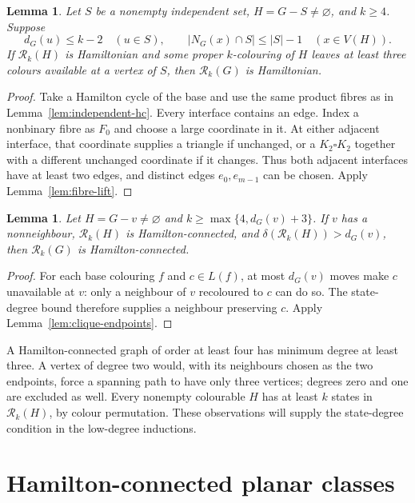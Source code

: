 \documentclass[11pt]{article}
\newtheorem{lemma}[theorem]{Lemma}
\theoremstyle{remark}
\newcommand{\Rk}{\mathcal R_k}
\numberwithin{equation}{section}
\numberwithin{table}{section}
\begin{document}
\begin{lemma}
\label{lem:independent-restoration}
Let $S$ be a nonempty independent set, $H=G-S\ne\varnothing$, and
$k\ge4$.  Suppose
\[
 d_G(u)\le k-2\quad(u\in S),\qquad
 |N_G(x)\cap S|\le |S|-1\quad(x\in V(H)).
\]
If $\Rk(H)$ is Hamiltonian and some proper $k$-colouring of $H$ leaves
at least three colours available at a vertex of $S$, then $\Rk(G)$ is
Hamiltonian.
\end{lemma}

\begin{proof}
Take a Hamilton cycle of the base and use the same product fibres as in
Lemma~\ref{lem:independent-hc}.  Every interface contains an edge.
Index a nonbinary fibre as $F_0$ and choose a large coordinate in it.
At either adjacent interface, that coordinate supplies a triangle if
unchanged, or a $K_2\square K_2$ together with a different unchanged
coordinate if it changes.  Thus both adjacent interfaces have at least
two edges, and distinct edges $e_0,e_{m-1}$ can be chosen.  Apply
Lemma~\ref{lem:fibre-lift}.
\end{proof}

\begin{lemma}\label{lem:single-hc}
Let $H=G-v\ne\varnothing$ and $k\ge\max\{4,d_G(v)+3\}$.
If $v$ has a nonneighbour, $\Rk(H)$ is Hamilton-connected, and
$\delta(\Rk(H))>d_G(v)$, then $\Rk(G)$ is Hamilton-connected.
\end{lemma}
\begin{proof}
For each base colouring $f$ and $c\in L(f)$, at most $d_G(v)$
moves make $c$ unavailable at $v$: only a neighbour of $v$
recoloured to $c$ can do so. The state-degree bound therefore
supplies a neighbour preserving $c$.
Apply Lemma~\ref{lem:clique-endpoints}.
\end{proof}

A Hamilton-connected graph of order at least four has minimum degree at
least three.  A vertex of degree two would, with its neighbours chosen
as the two endpoints, force a spanning path to have only three vertices;
degrees zero and one are excluded as well.  Every nonempty colourable
$H$ has at least $k$ states in $\Rk(H)$, by colour permutation.
These observations will supply the state-degree condition in the
low-degree inductions.

\section{Hamilton-connected planar classes}
\label{sec:hc-planar}
\end{document}
